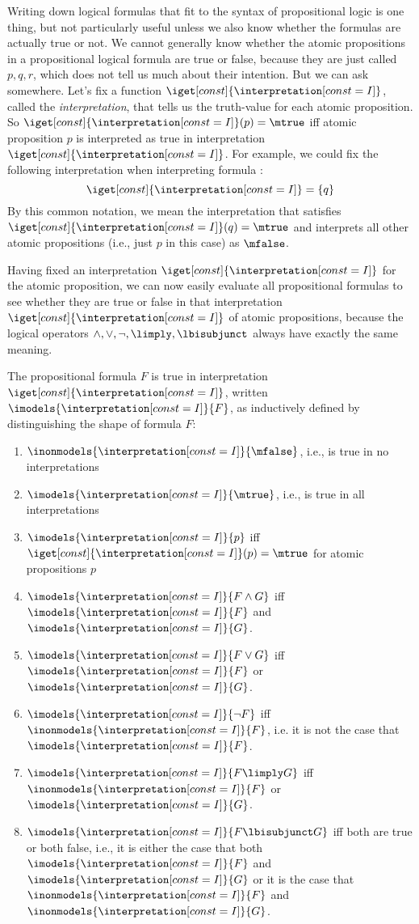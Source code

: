 \documentclass[11pt,twoside]{scrartcl}
\newcommand{\I}{\interpretation[const=I]}
\begin{document}
Writing down logical formulas that fit to the syntax of propositional logic is one thing, but not particularly useful unless we also know whether the formulas are actually true or not.
We cannot generally know whether the atomic propositions in a propositional logical formula are true or false, because they are just called $p,q,r$, which does not tell us much about their intention.
But we can ask somewhere.
Let's fix a function $\iget[const]{\I}$, called the \emph{interpretation}, that tells us the truth-value for each atomic proposition.
So \(\iget[const]{\I}(p)=\mtrue\) iff atomic proposition $p$ is interpreted as true in interpretation $\iget[const]{\I}$.
For example, we could fix the following interpretation when interpreting formula :
\begin{equation}
\iget[const]{\I} = \{q\}
\label{eq:int1}
\end{equation}
By this common notation, we mean the interpretation that satisfies \(\iget[const]{\I}(q)=\mtrue\) and interprets all other atomic propositions (i.e., just $p$ in this case) as $\mfalse$.

Having fixed an interpretation $\iget[const]{\I}$ for the atomic proposition, we can now easily evaluate all propositional formulas to see whether they are true or false in that interpretation $\iget[const]{\I}$ of atomic propositions, because the logical operators $\land,\lor,\lnot,\limply,\lbisubjunct$ always have exactly the same meaning.

\begin{definition} \label{def:propositional-semantics}
The propositional formula $F$ is true in interpretation $\iget[const]{\I}$, written \(\imodels{\I}{F}\), as inductively defined by distinguishing the shape of formula $F$:
\begin{enumerate}
\item \(\inonmodels{\I}{\mfalse}\), i.e., \mfalse is true in no interpretations
\item \(\imodels{\I}{\mtrue}\), i.e., \mtrue is true in all interpretations
\item \(\imodels{\I}{p}\) iff \(\iget[const]{\I}(p)=\mtrue\) for atomic propositions $p$
\item \(\imodels{\I}{F\land G}\) iff \(\imodels{\I}{F}\) and \(\imodels{\I}{G}\).
\item \(\imodels{\I}{F\lor G}\) iff \(\imodels{\I}{F}\) or \(\imodels{\I}{G}\).
\item \(\imodels{\I}{\lnot F}\) iff \(\inonmodels{\I}{F}\), i.e. it is not the case that \(\imodels{\I}{F}\).
\item \(\imodels{\I}{F\limply G}\) iff \(\inonmodels{\I}{F}\) or \(\imodels{\I}{G}\).
\item \(\imodels{\I}{F\lbisubjunct G}\) iff both are true or both false, i.e., it is either the case that both \(\imodels{\I}{F}\) and \(\imodels{\I}{G}\) or it is the case that \(\inonmodels{\I}{F}\) and \(\inonmodels{\I}{G}\).
\end{enumerate}
\end{definition}
\end{document}
